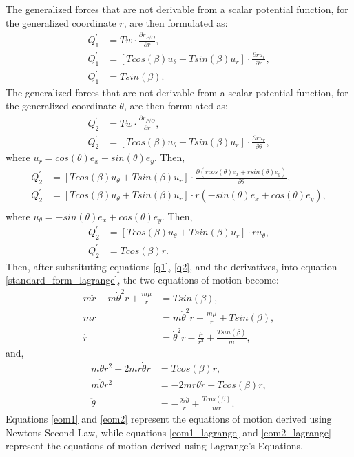 \documentclass[]{article}
\begin{document}
The generalized forces that are not derivable from a scalar potential function, for the generalized coordinate \(r\), are then formulated as:
\begin{align}
	Q^{'}_{1} &= Tw \cdot  \frac{\partial r_{P/O}}{\partial r}, \nonumber\\
	Q^{'}_{1} &= [Tcos(\beta)u_{\theta} + Tsin(\beta)u_{r}] \cdot \frac{\partial ru_{r}}{\partial r}, \nonumber\\
	Q^{'}_{1} &= Tsin(\beta) \label{q1}.
\end{align}
The generalized forces that are not derivable from a scalar potential function, for the generalized coordinate \(\theta\), are then formulated as:
\begin{align*}
	Q^{'}_{2} &= Tw \cdot  \frac{\partial r_{P/O}}{\partial r}, \\
	Q^{'}_{2} &= [Tcos(\beta)u_{\theta} + Tsin(\beta)u_{r}] \cdot \frac{\partial ru_{r}}{\partial \theta},
\end{align*}
where \(u_r = cos(\theta)e_{x} + sin(\theta)e_{y}\). Then,
\begin{align*}
	Q^{'}_{2} &= [Tcos(\beta)u_{\theta} + Tsin(\beta)u_{r}] \cdot \frac{\partial (rcos(\theta)e_{x} + rsin(\theta)e_{y})}{\partial \theta}, \\
	Q^{'}_{2} &= [Tcos(\beta)u_{\theta} + Tsin(\beta)u_{r}] \cdot r(-sin(\theta)e_{x} + cos(\theta)e_{y}), \\
\end{align*}
where \(u_{\theta} = -sin(\theta)e_{x} + cos(\theta)e_{y}\). Then,
\begin{align}
	Q^{'}_{2} &= [Tcos(\beta)u_{\theta} + Tsin(\beta)u_{r}] \cdot ru_{\theta}, \nonumber\\
	Q^{'}_{2} &= Tcos(\beta)r. \label{q2}
\end{align}
Then, after substituting equations \ref{q1}, \ref{q2}, and the derivatives, into equation \ref{standard_form_lagrange}, the two equations of motion become:
\begin{align}
 m\ddot{r} - m\dot{\theta}^2r + \frac{m\mu}{r} &= Tsin(\beta), \nonumber\\
 m\ddot{r}                                     &= m\dot{\theta}^2r - \frac{m\mu}{r} + Tsin(\beta), \nonumber\\
 \ddot{r}                                      &= \dot{\theta}^2r - \frac{\mu}{r^2} + \frac{Tsin(\beta)}{m} \label{eom1_lagrange},
\end{align}
and,
\begin{align}
 m\ddot{\theta}r^2 + 2mr\dot{\theta}\dot{r}    &= Tcos(\beta)r, \nonumber\\
 m\ddot{\theta}r^2                             &= -2mr\dot{\theta}\dot{r} + Tcos(\beta)r, \nonumber\\
 \ddot{\theta}                                &= -\frac{2\dot{r}\dot{\theta}}{r}   + \frac{Tcos(\beta)}{mr} \label{eom2_lagrange}.
\end{align}
\noindent
Equations \ref{eom1} and \ref{eom2} represent the equations of motion derived using Newtons Second Law, while equations \ref{eom1_lagrange} and \ref{eom2_lagrange} represent the equations of motion derived using Lagrange's Equations. 
\end{document}
